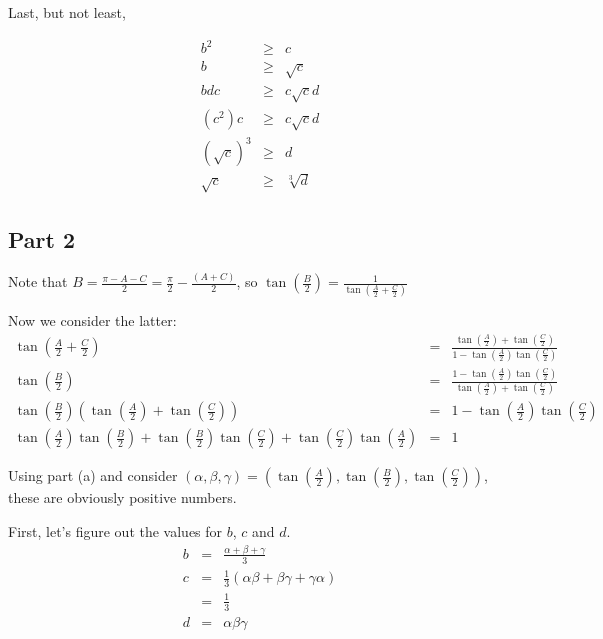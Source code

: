 Last, but not least, 

\begin{eqnarray*}
  b^2 &\ge& c \\
  b &\ge& \sqrt{c} \\
  bdc &\ge& c\sqrt{c}d \\
  (c^2)c &\ge& c\sqrt{c}d \\
  (\sqrt{c})^3 &\ge& d \\
  \sqrt{c} &\ge& \sqrt[3]{d}
\end{eqnarray*}

\subsection*{Part 2}
Note that $ B = \frac{\pi - A - C}{2} = \frac{\pi}{2} - \frac{(A+C)}{2} $, so $ \tan\left(\frac{B}{2}\right) = \frac{1}{\tan(\frac{A}{2}+\frac{C}{2})} $

Now we consider the latter:
\begin{eqnarray*}
  \tan\left(\frac{A}{2}+\frac{C}{2}\right) &=& \frac{\tan\left(\frac{A}{2}\right) + \tan\left(\frac{C}{2}\right)}{1 - \tan\left(\frac{A}{2}\right)\tan\left(\frac{C}{2}\right)} \\
  \tan\left(\frac{B}{2}\right) &=& \frac{1 - \tan\left(\frac{A}{2}\right)\tan\left(\frac{C}{2}\right)}{\tan\left(\frac{A}{2}\right) + \tan\left(\frac{C}{2}\right)} \\
  \tan\left(\frac{B}{2}\right)\left(\tan\left(\frac{A}{2}\right) + \tan\left(\frac{C}{2}\right)\right) &=& 1 - \tan\left(\frac{A}{2}\right)\tan\left(\frac{C}{2}\right) \\
  \tan\left(\frac{A}{2}\right)\tan\left(\frac{B}{2}\right) + \tan\left(\frac{B}{2}\right)\tan\left(\frac{C}{2}\right) + \tan\left(\frac{C}{2}\right)\tan\left(\frac{A}{2}\right) &=& 1
\end{eqnarray*}

Using part (a) and consider $ (\alpha, \beta, \gamma) = (\tan\left(\frac{A}{2}\right), \tan\left(\frac{B}{2}\right), \tan\left(\frac{C}{2}\right)) $, these are obviously positive numbers.

First, let's figure out the values for $ b $, $ c $ and $ d $.
\begin{eqnarray*}
  b &=& \frac{\alpha + \beta + \gamma}{3} \\
  c &=& \frac{1}{3}(\alpha\beta + \beta\gamma + \gamma\alpha) \\
    &=& \frac{1}{3} \\
  d &=& \alpha \beta \gamma
\end{eqnarray*}


